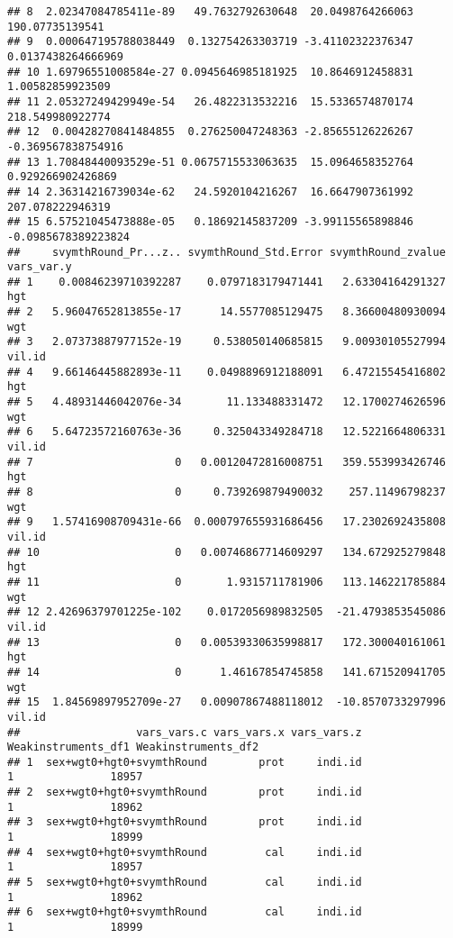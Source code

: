 \documentclass[
]{book}
\begin{document}
\begin{verbatim}
## 8  2.02347084785411e-89   49.7632792630648  20.0498764266063      190.07735139541
## 9  0.000647195788038449  0.132754263303719 -3.41102322376347   0.0137438264666969
## 10 1.69796551008584e-27 0.0945646985181925  10.8646912458831     1.00582859923509
## 11 2.05327249429949e-54   26.4822313532216  15.5336574870174     218.549980922774
## 12  0.00428270841484855  0.276250047248363 -2.85655126226267   -0.369567838754916
## 13 1.70848440093529e-51 0.0675715533063635  15.0964658352764    0.929266902426869
## 14 2.36314216739034e-62   24.5920104216267  16.6647907361992     207.078222946319
## 15 6.57521045473888e-05   0.18692145837209 -3.99115565898846  -0.0985678389223824
##     svymthRound_Pr...z.. svymthRound_Std.Error svymthRound_zvalue vars_var.y
## 1    0.00846239710392287    0.0797183179471441   2.63304164291327        hgt
## 2   5.96047652813855e-17      14.5577085129475   8.36600480930094        wgt
## 3   2.07373887977152e-19     0.538050140685815   9.00930105527994     vil.id
## 4   9.66146445882893e-11    0.0498896912188091   6.47215545416802        hgt
## 5   4.48931446042076e-34       11.133488331472   12.1700274626596        wgt
## 6   5.64723572160763e-36     0.325043349284718   12.5221664806331     vil.id
## 7                      0   0.00120472816008751   359.553993426746        hgt
## 8                      0     0.739269879490032    257.11496798237        wgt
## 9   1.57416908709431e-66  0.000797655931686456   17.2302692435808     vil.id
## 10                     0   0.00746867714609297   134.672925279848        hgt
## 11                     0       1.9315711781906   113.146221785884        wgt
## 12 2.42696379701225e-102    0.0172056989832505  -21.4793853545086     vil.id
## 13                     0   0.00539330635998817   172.300040161061        hgt
## 14                     0      1.46167854745858   141.671520941705        wgt
## 15  1.84569897952709e-27   0.00907867488118012  -10.8570733297996     vil.id
##                  vars_vars.c vars_vars.x vars_vars.z Weakinstruments_df1 Weakinstruments_df2
## 1  sex+wgt0+hgt0+svymthRound        prot     indi.id                   1               18957
## 2  sex+wgt0+hgt0+svymthRound        prot     indi.id                   1               18962
## 3  sex+wgt0+hgt0+svymthRound        prot     indi.id                   1               18999
## 4  sex+wgt0+hgt0+svymthRound         cal     indi.id                   1               18957
## 5  sex+wgt0+hgt0+svymthRound         cal     indi.id                   1               18962
## 6  sex+wgt0+hgt0+svymthRound         cal     indi.id                   1               18999

\end{verbatim}
\end{document}
